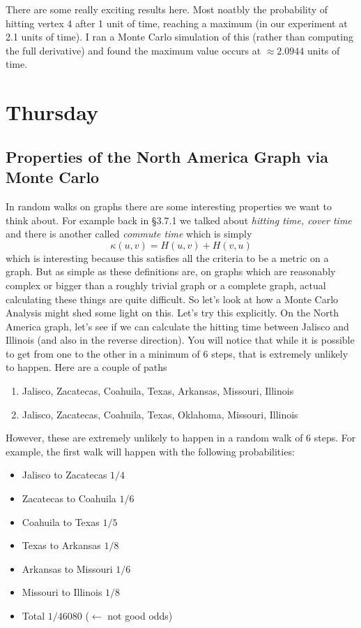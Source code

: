 \documentclass{article}
\theoremstyle{definition}
\theoremstyle{remark}
\begin{document}
There are some really exciting results here.  Most noatbly the probability of hitting vertex 4 after 1 unit of time, reaching a maximum (in our experiment at 2.1 units of time).  I ran a Monte Carlo simulation of this (rather than computing the full derivative) and found the maximum value occurs at $\approx 2.0944$ units of time.


\section{Thursday}
\subsection{Properties of the North America Graph via Monte Carlo}

In random walks on graphs there are some interesting properties we want to think about.  For example back in \S3.7.1 we talked about \emph{hitting time, cover time} and there is another called \emph{commute time} which is simply
\[
\kappa(u,v) = H(u,v) + H(v,u)
\]
which is interesting because this satisfies all the criteria to be a metric on a graph. But as simple as these definitions are, on graphs which are reasonably complex or bigger than a roughly trivial graph or a complete graph, actual calculating these things are quite difficult. So let's look at how a Monte Carlo Analysis might shed some light on this.  Let's try this explicitly.  On the North America graph, let's see if we can calculate the hitting time between Jalisco and Illinois (and also in the reverse direction).  You will notice that while it is possible to get from one to the other in a minimum of 6 steps, that is extremely unlikely to happen.  Here are a couple of paths
\begin{enumerate}
	\item Jalisco, Zacatecas, Coahuila, Texas, Arkansas, Missouri, Illinois
	\item Jalisco, Zacatecas, Coahuila, Texas, Oklahoma, Missouri, Illinois
\end{enumerate}

However, these are extremely unlikely to happen in a random walk of 6 steps.
For example, the first walk will happen with the following probabilities:
\begin{itemize}
	\item Jalisco to Zacatecas $1/4$
	\item Zacatecas to Coahuila $1/6$
	\item Coahuila to Texas $1/5$
	\item Texas to Arkansas $1/8$
	\item Arkansas to Missouri $1/6$
	\item Missouri to Illinois $1/8$
	\item Total $1/46080$ ($\leftarrow$ not good odds)
\end{itemize}
\end{document}
